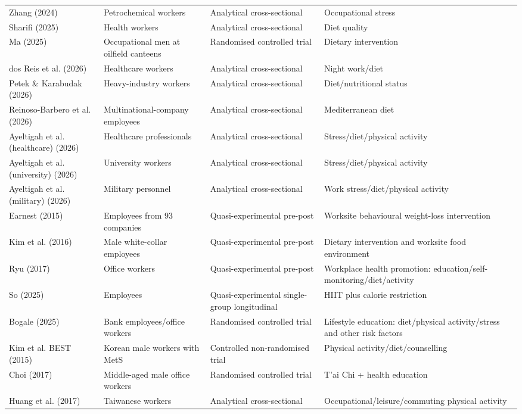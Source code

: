 \begin{longtable}{p{} p{} p{} p{}}
    Zhang (2024) & Petrochemical workers & Analytical cross-sectional & Occupational stress \\
    Sharifi (2025) & Health workers & Analytical cross-sectional & Diet quality \\
    Ma (2025) & Occupational men at oilfield canteens & Randomised controlled trial & Dietary intervention \\
    dos Reis et al. (2026) & Healthcare workers & Analytical cross-sectional & Night work/diet \\
    Petek \& Karabudak (2026) & Heavy-industry workers & Analytical cross-sectional & Diet/nutritional status \\
    Reinoso-Barbero et al. (2026) & Multinational-company employees & Analytical cross-sectional & Mediterranean diet \\
    Ayeltigah et al. (healthcare) (2026) & Healthcare professionals & Analytical cross-sectional & Stress/diet/physical activity \\
    Ayeltigah et al. (university) (2026) & University workers & Analytical cross-sectional & Stress/diet/physical activity \\
    Ayeltigah et al. (military) (2026) & Military personnel & Analytical cross-sectional & Work stress/diet/physical activity \\
    Earnest (2015) & Employees from 93 companies & Quasi-experimental pre-post & Worksite behavioural weight-loss intervention \\
    Kim et al. (2016) & Male white-collar employees & Quasi-experimental pre-post & Dietary intervention and worksite food environment \\
    Ryu (2017) & Office workers & Quasi-experimental pre-post & Workplace health promotion: education/self-monitoring/diet/activity \\
    So (2025) & Employees & Quasi-experimental single-group longitudinal & HIIT plus calorie restriction \\
    Bogale (2025) & Bank employees/office workers & Randomised controlled trial & Lifestyle education: diet/physical activity/stress and other risk factors \\
    Kim et al. BEST (2015) & Korean male workers with MetS & Controlled non-randomised trial & Physical activity/diet/counselling \\
    Choi (2017) & Middle-aged male office workers & Randomised controlled trial & T'ai Chi + health education \\
    Huang et al. (2017) & Taiwanese workers & Analytical cross-sectional & Occupational/leisure/commuting physical activity \\

\end{longtable}
